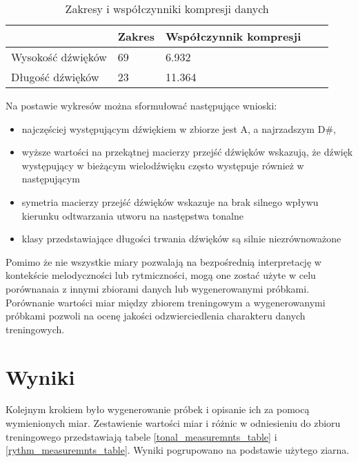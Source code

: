 {{        %
        \begin{table}
            \caption{Zakresy i\,\,współczynniki kompresji danych} \label{range_and_compression}
            \begin{center}
                \begin{tabular}{ |p{2.5cm}|p{2.5cm}|p{2.5cm}|p{2.5cm}|p{2.5cm}| }
                \hline
                 & Zakres & Współczynnik kompresji \\ 
                \hline
                Wysokość dźwięków & 69 & 6.932 \\  
                \hline
                Długość dźwięków & 23 & 11.364 \\
                \hline
                \end{tabular}
            \end{center}
        \end{table}

        \pagebreak

        Na postawie wykresów można sformułować następujące wnioski:
        \begin{itemize}
            \setlength\itemsep{-0.5em}
            \item najczęściej występującym dźwiękiem w\,\,zbiorze jest A, a\,\,najrzadszym D\#,
            \item wyższe wartości na przekątnej macierzy przejść dźwięków wskazują, że dźwięk występujący w\,\,bieżącym wielodźwięku
            często występuje również w\,\,następującym
            \item symetria macierzy przejść dźwięków wskazuje na brak silnego wpływu kierunku odtwarzania utworu na następstwa tonalne
            \item klasy przedstawiające długości trwania dźwięków są silnie niezrównoważone
        \end{itemize}

        Pomimo że nie wszystkie miary pozwalają na bezpośrednią interpretację w kontekście melodyczności lub rytmiczności, 
        mogą one zostać użyte w celu porównanaia z innymi zbiorami danych lub wygenerowanymi próbkami. 
        Porównanie wartości miar między zbiorem treningowym a wygenerowanymi próbkami pozwoli na ocenę 
        jakości odzwierciedlenia charakteru danych treningowych.
    }

    \section{Wyniki}
    {
        Kolejnym krokiem było wygenerowanie próbek i\,\,opisanie ich za pomocą wymienionych miar. Zestawienie wartości miar i\,\,różnic
        w\,\,odniesieniu do zbioru treningowego przedstawiają tabele \ref{tonal_measuremnts_table} i\,\,\ref{rythm_measuremnts_table}. Wyniki pogrupowano na podstawie użytego ziarna.

}}
